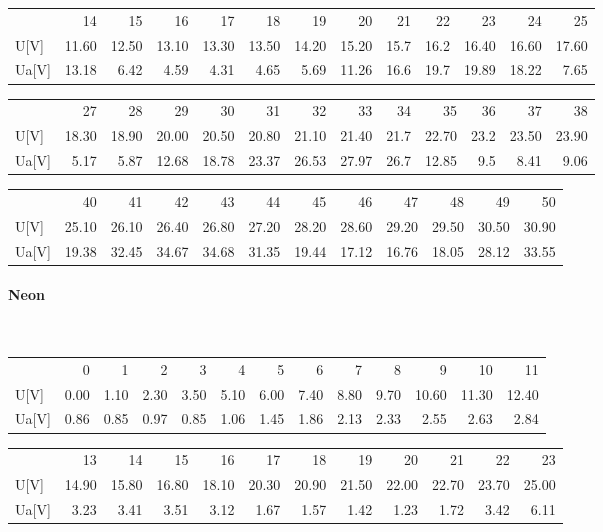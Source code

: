 \documentclass[a4paper,10pt]{article}
\begin{document}
\begin{tabular}{l rrrrrrrrrrrr}
{} &     14 &     15 &     16 &     17 &     18 &     19 &     20 &    21 &    22 &     23 &     24 &     25 \\
U[V]  &  11.60 &  12.50 &  13.10 &  13.30 &  13.50 &  14.20 &  15.20 &  15.7 &  16.2 &  16.40 &  16.60 &  17.60 \\
Ua[V] &  13.18 &   6.42 &   4.59 &   4.31 &   4.65 &   5.69 &  11.26 &  16.6 &  19.7 &  19.89 &  18.22 &   7.65 \\
\end{tabular}

\begin{tabular}{l rrrrrrrrrrrr}
{} &     27 &     28 &     29 &     30 &     31 &     32 &     33 &    34 &     35 &    36 &     37 &     38 \\
U[V]  &  18.30 &  18.90 &  20.00 &  20.50 &  20.80 &  21.10 &  21.40 &  21.7 &  22.70 &  23.2 &  23.50 &  23.90 \\
Ua[V] &   5.17 &   5.87 &  12.68 &  18.78 &  23.37 &  26.53 &  27.97 &  26.7 &  12.85 &   9.5 &   8.41 &   9.06 \\
\end{tabular}

\begin{tabular}{l rrrrrrrrrrr}
{} &     40 &     41 &     42 &     43 &     44 &     45 &     46 &     47 &     48 &     49 &     50 \\
U[V]  &  25.10 &  26.10 &  26.40 &  26.80 &  27.20 &  28.20 &  28.60 &  29.20 &  29.50 &  30.50 &  30.90 \\
Ua[V] &  19.38 &  32.45 &  34.67 &  34.68 &  31.35 &  19.44 &  17.12 &  16.76 &  18.05 &  28.12 &  33.55 \\
\end{tabular}
\paragraph{Neon}\\
\begin{tabular}{lrrrrrrrrrrrr}
{} &    0  &    1  &    2  &    3  &    4  &    5  &    6  &    7  &    8  &     9  &     10 &     11 \\
U[V]  &  0.00 &  1.10 &  2.30 &  3.50 &  5.10 &  6.00 &  7.40 &  8.80 &  9.70 &  10.60 &  11.30 &  12.40 \\
Ua[V] &  0.86 &  0.85 &  0.97 &  0.85 &  1.06 &  1.45 &  1.86 &  2.13 &  2.33 &   2.55 &   2.63 &   2.84 \\
\end{tabular}
\begin{tabular}{lrrrrrrrrrrr}
{} &     13 &     14 &     15 &     16 &     17 &     18 &     19 &     20 &     21 &     22 &     23 \\
U[V]  &  14.90 &  15.80 &  16.80 &  18.10 &  20.30 &  20.90 &  21.50 &  22.00 &  22.70 &  23.70 &  25.00 \\
Ua[V] &   3.23 &   3.41 &   3.51 &   3.12 &   1.67 &   1.57 &   1.42 &   1.23 &   1.72 &   3.42 &   6.11 \\
\end{tabular}
\end{document}
